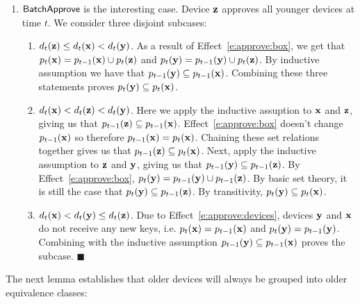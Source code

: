 \begin{enumerate}
 \item $\mathsf{BatchApprove}{}$ is the interesting case. Device
  $\mathbf{z}$ approves all younger devices at time $t$. We consider three
  disjoint subcases:
  \begin{enumerate}
    \item $d_t(\mathbf{z}) \leq d_t(\mathbf{x}) < d_t(\mathbf{y})$.
      As a result of Effect~\ref{e:approve:box}, we get that
        $p_t(\mathbf{x}) = p_{t-1}(\mathbf{x}) \cup p_t(\mathbf{z})$ and
        $p_t(\mathbf{y}) = p_{t-1}(\mathbf{y}) \cup p_t(\mathbf{z})$.
        By inductive assumption we have that 
        $p_{t-1}(\mathbf{y}) \subseteq p_{t-1}(\mathbf{x})$. Combining
        these three statements proves 
         $p_t(\mathbf{y}) \subseteq p_t(\mathbf{x})$.

    \item $d_t(\mathbf{x}) < d_t(\mathbf{z}) < d_t(\mathbf{y})$.
      Here we apply the inductive assuption to $\mathbf{x}$ and $\mathbf{z}$, giving
      us that $p_{t-1}(\mathbf{z}) \subseteq p_{t-1}(\mathbf{x})$.
      Effect~\ref{e:approve:box} doesn't change $p_{t-1}(\mathbf{x})$
      so therefore $p_{t-1}(\mathbf{x}) = p_{t}(\mathbf{x})$.
      Chaining these set relations together gives 
      us that $p_{t-1}(\mathbf{z}) \subseteq p_{t}(\mathbf{x})$.
      Next, apply the inductive assumption to $\mathbf{z}$ and $\mathbf{y}$, giving
      us that $p_{t-1}(\mathbf{y}) \subseteq p_{t-1}(\mathbf{z})$. 
      By Effect~\ref{e:approve:box}, $p_{t}(\mathbf{y}) = p_{t-1}(\mathbf{y})
      \cup p_{t-1}(\mathbf{z})$. By basic set theory, it is still the case
      that $p_{t}(\mathbf{y}) \subseteq p_{t-1}(\mathbf{z})$. By 
      transitivity, $p_{t}(\mathbf{y}) \subseteq
      p_{t}(\mathbf{x})$.

    \item $d_t(\mathbf{x}) < d_t(\mathbf{y}) \leq d_t(\mathbf{z})$.
      Due to Effect~\ref{e:approve:devices}, devices $\mathbf{y}$ and
      $\mathbf{x}$ do not receive any new keys, i.e.
      $p_{t}(\mathbf{x}) = p_{t-1}(\mathbf{x})$ and
      $p_{t}(\mathbf{y}) = p_{t-1}(\mathbf{y})$. Combining
      with the inductive assumption
       $p_{t-1}(\mathbf{y}) \subseteq p_{t-1}(\mathbf{x})$ proves
       the subcase. $\blacksquare$
  \end{enumerate}
\end{enumerate}

The next lemma establishes that older devices
will always be grouped into older equivalence classes:

